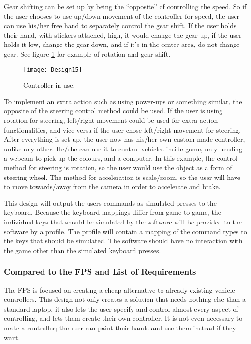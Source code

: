 \bigskip

Gear shifting can be set up by being the “opposite” of controlling the speed. So if the user chooses to use up/down movement of the controller for speed, the user can use his/her free hand to separately control the gear shift. If the user holds their hand, with stickers attached, high, it would change the gear up, if the user holds it low, change the gear down, and if it’s in the center area, do not change gear. See figure \ref{fig:design15} for example of rotation and gear shift.

\begin{figure}[h]
\centering
\texttt{[image: Design15]}
\caption{Controller in use.}
\label{fig:design15}
\end{figure}

To implement an extra action such as using power-ups or something similar, the opposite of the steering control method could be used. If the user is using rotation for steering, left/right movement could be used for extra action functionalities, and vice versa if the user chose left/right movement for steering.
After everything is set up, the user now has his/her own custom-made controller, unlike any other. He/she can use it to control vehicles inside game, only needing a webcam to pick up the colours, and a computer. In this example, the control method for steering is rotation, so the user would use the object as a form of steering wheel. The method for acceleration is scale/zoom, so the user will have to move towards/away from the camera in order to accelerate and brake.
\bigskip

This design will output the users commands as simulated presses to the keyboard. 
Because the keyboard mappings differ from game to game, the individual keys that should be simulated by the software will be provided to the software by a profile.
The profile will contain a mapping of the command types to the keys that should be simulated. 
The software should have no interaction with the game other than the simulated keyboard presses.

\subsubsection*{Compared to the FPS and List of Requirements}
The FPS is focused on creating a cheap alternative to already existing vehicle controllers. This design not only creates a solution that needs nothing else than a standard laptop, it also lets the user specify and control almost every aspect of controlling, and lets them create their own controller. It is not even necessary to make a controller; the user can paint their hands and use them instead if they want.

